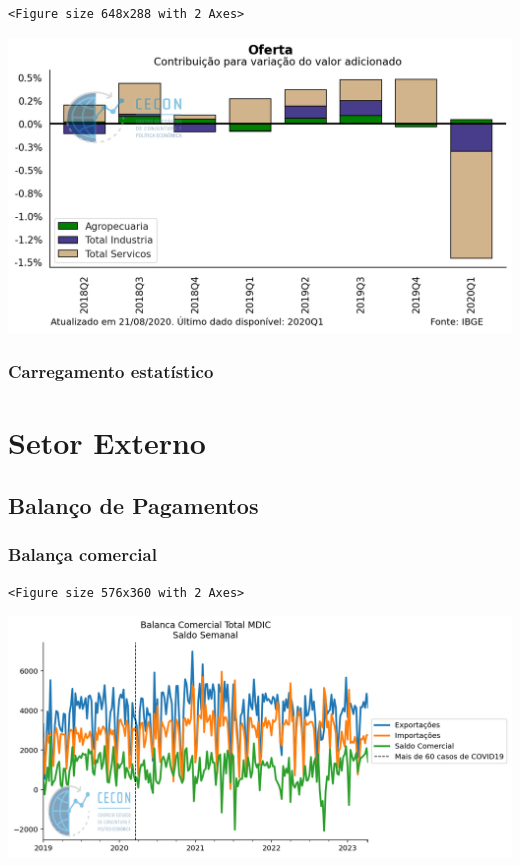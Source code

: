 \documentclass[11pt]{article}
\begin{document}
\begin{enumerate}
\begin{verbatim}
<Figure size 648x288 with 2 Axes>
\end{verbatim}


\begin{center}
\includegraphics[width=.9\linewidth]{obipy-resources/62e383af79e91b63c7fc98dd7fb55b3c3ececcb9/006f9c8b5a1420511cea75997fc149369a2d681b.png}
\end{center}
\end{enumerate}

\subsubsection{Carregamento estatístico}
\label{sec:org5b9358c}



\section{Setor Externo}
\label{sec:org4475161}


\subsection{Balanço de Pagamentos}
\label{sec:org4a93726}



\subsubsection{Balança comercial}
\label{sec:org5c4a158}

\begin{verbatim}
<Figure size 576x360 with 2 Axes>
\end{verbatim}


\begin{center}
\includegraphics[width=.9\linewidth]{obipy-resources/62e383af79e91b63c7fc98dd7fb55b3c3ececcb9/f1c4885a01e6444c6609a1d07aa340fa6875fa4f.png}
\end{center}
\end{document}
